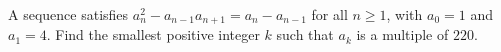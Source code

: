 A sequence satisfies $a_n^2-a_{n-1}a_{n+1}=a_n-a_{n-1}$ for all $n\ge1$, with $a_0=1$ and $a_1=4$. Find the smallest positive integer $k$ such that $a_k$ is a multiple of $220$.
